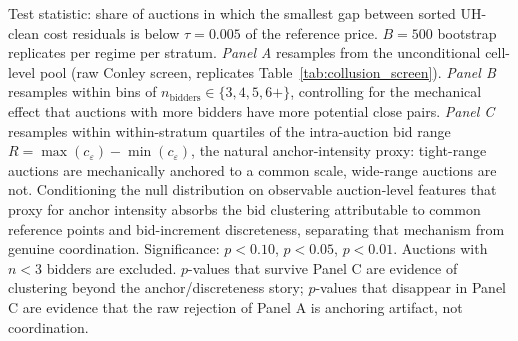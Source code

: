 \begin{table}[!htbp]
\begin{threeparttable}
\begin{tablenotes}[flushleft]
\item Test statistic: share of auctions in which the smallest gap between sorted UH-clean cost residuals is below $\tau = 0.005$ of the reference price. $B = 500$ bootstrap replicates per regime per stratum. \emph{Panel A} resamples from the unconditional cell-level pool (raw Conley screen, replicates Table~\ref{tab:collusion_screen}). \emph{Panel B} resamples within bins of $n_{\mathrm{bidders}}\in\{3,4,5,6+\}$, controlling for the mechanical effect that auctions with more bidders have more potential close pairs. \emph{Panel C} resamples within within-stratum quartiles of the intra-auction bid range $R = \max(c_\varepsilon) - \min(c_\varepsilon)$, the natural anchor-intensity proxy: tight-range auctions are mechanically anchored to a common scale, wide-range auctions are not. Conditioning the null distribution on observable auction-level features that proxy for anchor intensity absorbs the bid clustering attributable to common reference points and bid-increment discreteness, separating that mechanism from genuine coordination. Significance: \sym{*} $p<0.10$, \sym{**} $p<0.05$, \sym{***} $p<0.01$. Auctions with $n<3$ bidders are excluded. $p$-values that survive Panel C are evidence of clustering beyond the anchor/discreteness story; $p$-values that disappear in Panel C are evidence that the raw rejection of Panel A is anchoring artifact, not coordination.
\end{tablenotes}
\end{threeparttable}
\end{table}
